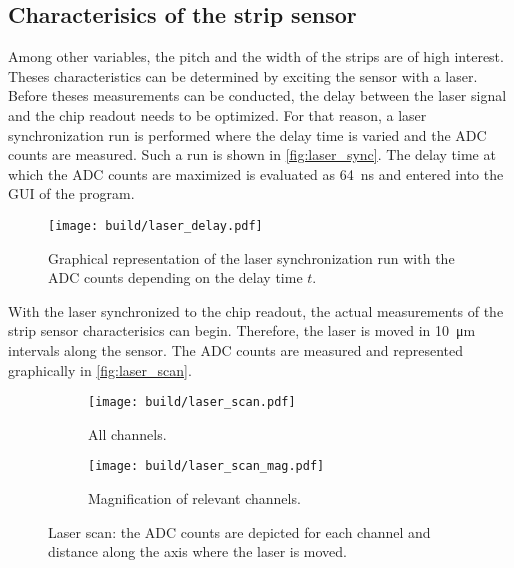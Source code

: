 \subsection{Characterisics of the strip sensor}
\label{sec:characteristics_strip_sensor}
Among other variables, the pitch and the width of the strips are of high interest. Theses characteristics can be determined by exciting the sensor with a laser.
Before theses measurements can be conducted, the delay between the laser signal and the chip readout needs to be optimized. For that reason, a laser synchronization
run is performed where the delay time is varied and the ADC counts are measured. Such a run is shown in \autoref{fig:laser_sync}. The delay time at which the ADC
counts are maximized is evaluated as \qty{64}{\nano\second} and entered into the GUI of the program.
\begin{figure}
    \centering
    \texttt{[image: build/laser\_delay.pdf]}
    \caption{Graphical representation of the laser synchronization run with the ADC counts depending on the delay time $t$.}
    \label{fig:laser_sync}
\end{figure}

With the laser synchronized to the chip readout, the actual measurements of the strip sensor characterisics can begin. Therefore, the laser is moved 
in \qty{10}{\micro\metre} intervals along the sensor. The ADC counts are measured and represented graphically in \autoref{fig:laser_scan}.
\begin{figure}
    \centering
    \begin{subfigure}{0.49\textwidth}
        \texttt{[image: build/laser\_scan.pdf]}
        \caption{All channels.}
        \label{fig:laser_scan_all_channels}
    \end{subfigure}
    \hfill
    \begin{subfigure}{0.49\textwidth}
        \texttt{[image: build/laser\_scan\_mag.pdf]}
        \caption{Magnification of relevant channels.}
        \label{fig:laser_scan_mag}
    \end{subfigure}
    \caption{Laser scan: the ADC counts are depicted for each channel and distance along the axis where the laser is moved.}
    \label{fig:laser_scan}
\end{figure}

